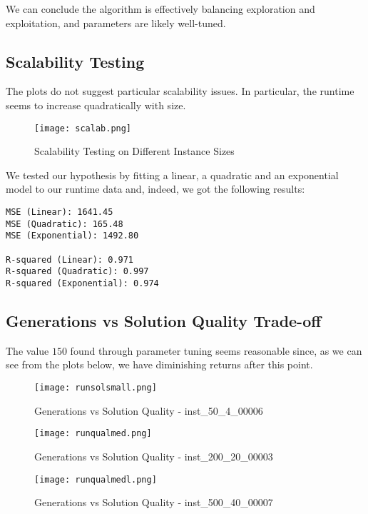 \documentclass{article}
\begin{document}
We can conclude the algorithm is effectively balancing exploration and exploitation, and parameters are likely well-tuned.

\subsection{Scalability Testing}

The plots do not suggest particular scalability issues. In particular, the runtime seems to increase quadratically with size. 

\begin{figure}[H]
    \centering
    \texttt{[image: scalab.png]}
    \caption{Scalability Testing on Different Instance Sizes}
    \label{fig:enter-label}
\end{figure}

We tested our hypothesis by fitting a linear, a quadratic and an exponential model to our runtime data and, indeed, we got the following results:

\begin{verbatim}
MSE (Linear): 1641.45
MSE (Quadratic): 165.48
MSE (Exponential): 1492.80

R-squared (Linear): 0.971
R-squared (Quadratic): 0.997
R-squared (Exponential): 0.974
\end{verbatim}

\subsection{Generations vs Solution Quality Trade-off}

The value $150$ found through parameter tuning seems reasonable since, as we can see from the plots below, we have diminishing returns after this point.

\begin{figure}[H]
    \centering
    \texttt{[image: runsolsmall.png]}
    \caption{Generations vs Solution Quality - inst\_50\_4\_00006}
    \label{fig:enter-label}
\end{figure}

\begin{figure}[H]
    \centering
    \texttt{[image: runqualmed.png]}
    \caption{Generations vs Solution Quality - inst\_200\_20\_00003}
    \label{fig:enter-label}
\end{figure}

\begin{figure}[H]
    \centering
    \texttt{[image: runqualmedl.png]}
    \caption{Generations vs Solution Quality - inst\_500\_40\_00007}
    \label{fig:enter-label}
\end{figure}
\end{document}
